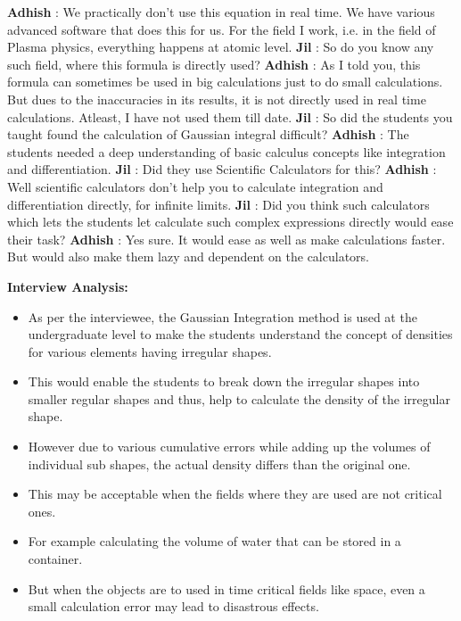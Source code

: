 \documentclass{article}
\begin{document}
{\textbf{Adhish} : We practically don't use this equation in real time. We have various advanced software that does this for us. For the field I work, i.e. in the field of Plasma physics,
 everything happens at atomic level.\hfill\break
\textbf{Jil} : So do you know any such field, where this formula is directly used?\hfill\break
\textbf{Adhish} : As I told you, this formula can sometimes be used in big calculations just to do small calculations. But dues to the inaccuracies in its results, it is not directly used in real time calculations. Atleast, I have not used them till date.
\textbf{Jil} : So did the students you taught found the calculation of Gaussian integral difficult?\hfill\break
\textbf{Adhish} : The students needed a deep understanding of basic calculus concepts like integration and differentiation.\hfill\break
\textbf{Jil} : Did they use Scientific Calculators for this?\hfill\break
\textbf{Adhish} : Well scientific calculators don't help you to calculate integration and differentiation directly, for infinite limits.\hfill\break
\textbf{Jil} : Did you think such calculators which lets the students let calculate such complex expressions directly would ease their task?\hfill\break
\textbf{Adhish} : Yes sure. It would ease as well as make calculations faster. But would also make them lazy and dependent on the calculators.\hfill\break\break}\hfill\break

\textbf{Interview Analysis: }
\begin{itemize}
    \item As per the interviewee, the Gaussian Integration method is used at the undergraduate level to make the students understand the concept of densities for various elements having irregular shapes.
    \item This would enable the students to break down the irregular shapes into smaller regular shapes and thus, help to calculate the density of the irregular shape. 
    \item However due to various cumulative errors while adding up the volumes of individual sub shapes, the actual density differs than the original one. 
    \item This may be acceptable when the fields where they are used are not critical ones. 
    \item For example calculating the volume of water that can be stored in a container. 
    \item But when the objects are to used in time critical fields like space, even a small calculation error may lead to disastrous effects.
\end{itemize}
\end{document}
